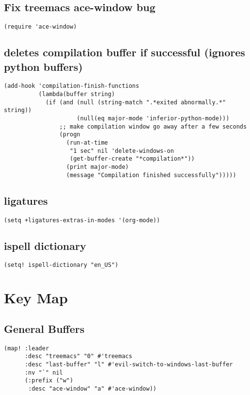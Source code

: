 \documentclass[11pt]{article}
\begin{document}
\subsection{Fix treemacs ace-window bug}
\label{sec:orge5a6efe}
\begin{verbatim}
(require 'ace-window)
\end{verbatim}
\subsection{deletes compilation buffer if successful (ignores python buffers)}
\label{sec:org8e14e31}
\begin{verbatim}
(add-hook 'compilation-finish-functions
          (lambda(buffer string)
            (if (and (null (string-match ".*exited abnormally.*" string))
                     (null(eq major-mode 'inferior-python-mode)))
                ;; make compilation window go away after a few seconds
                (progn
                  (run-at-time
                   "1 sec" nil 'delete-windows-on
                   (get-buffer-create "*compilation*"))
                  (print major-mode)
                  (message "Compilation finished successfully")))))
\end{verbatim}
\subsection{ligatures}
\label{sec:org4f5c63b}
\begin{verbatim}
(setq +ligatures-extras-in-modes '(org-mode))
\end{verbatim}
\subsection{ispell dictionary}
\label{sec:org732d24f}
\begin{verbatim}
(setq! ispell-dictionary "en_US")
\end{verbatim}

\section{Key Map}
\label{sec:orge808cf2}
\subsection{General Buffers}
\label{sec:org116b20e}
\begin{verbatim}
(map! :leader
      :desc "treemacs" "0" #'treemacs
      :desc "last-buffer" "l" #'evil-switch-to-windows-last-buffer
      :nv "`" nil
      (:prefix ("w")
       :desc "ace-window" "a" #'ace-window))
\end{verbatim}
\end{document}
